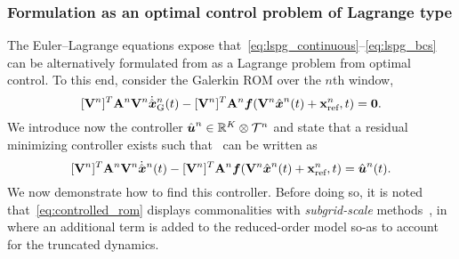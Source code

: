 \subsubsection{Formulation as an optimal control problem of Lagrange type}\label{sec:optimal_control} 
The Euler--Lagrange equations expose that~\eqref{eq:lspg_continuous}--\eqref{eq:lspg_bcs} can be alternatively formulated from as a Lagrange
problem from optimal control. To this end, consider the Galerkin ROM over the $n$th window, 
$$ \basisspaceTArg{n} \stweightingMatArgt{n}{t} \basisspaceArg{n}
 \genstateGalerkinDotArg{n}{t} - \basisspaceTArg{n} \stweightingMatArgt{n}{t}
\velocity(\veloargsromn) = \bz.$$
We introduce now the controller $\controllerArgnt{n} \in \RR{\romdim} \otimes \timeSpaceArg{n}$ 
and state that a residual minimizing controller exists such that \methodAcronym\ can be written as 
\begin{equation}\label{eq:controlled_rom}
 \basisspaceTArg{n}
\stweightingMatArgt{n}{t} \basisspaceArg{n} \genstateDotArg{n}{t}  - \basisspaceTArg{n}
\stweightingMatArgt{n}{t}\velocity(\veloargsromn) = \controllerArg{n}{t}. 
 \end{equation}
We now demonstrate how to find this controller.
Before doing so, it is noted that~\eqref{eq:controlled_rom} displays commonalities with \textit{subgrid-scale}
methods~\cite{iliescu_pod_eddyviscosity,iliescu_vms_pod_ns,iliescu_ciazzo_residual_rom,parish_apg,wentland_apg,Wang:269133,San2018},
in where an additional term is added to the reduced-order model so-as to
account for the truncated dynamics. 

